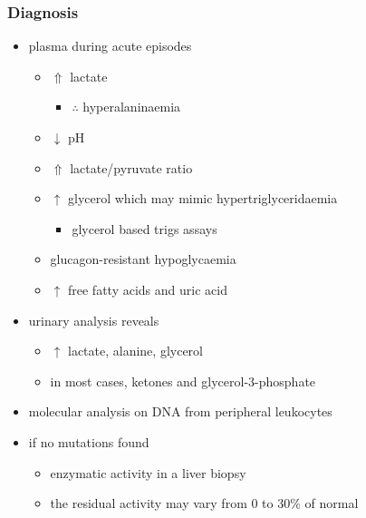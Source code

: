 \documentclass{scrartcl}
\begin{document}
\subsubsection{Diagnosis}
\label{sec:orgf09590d}
\begin{itemize}
\item plasma during acute episodes
\begin{itemize}
\item \(\Uparrow\) lactate
\begin{itemize}
\item \(\therefore\) hyperalaninaemia
\end{itemize}
\item \(\downarrow\) pH
\item \(\Uparrow\) lactate/pyruvate ratio
\item \(\uparrow\) glycerol which may mimic hypertriglyceridaemia
\begin{itemize}
\item glycerol based trigs assays
\end{itemize}
\item glucagon-resistant hypoglycaemia
\item \(\uparrow\) free fatty acids and uric acid
\end{itemize}
\item urinary analysis reveals
\begin{itemize}
\item \(\uparrow\) lactate, alanine, glycerol
\item in most cases, ketones and glycerol-3-phosphate
\end{itemize}

\item molecular analysis on DNA from peripheral leukocytes
\item if no mutations found
\begin{itemize}
\item enzymatic activity in a liver biopsy
\item the residual activity may vary from 0 to 30\% of normal
\end{itemize}
\end{itemize}
\end{document}
